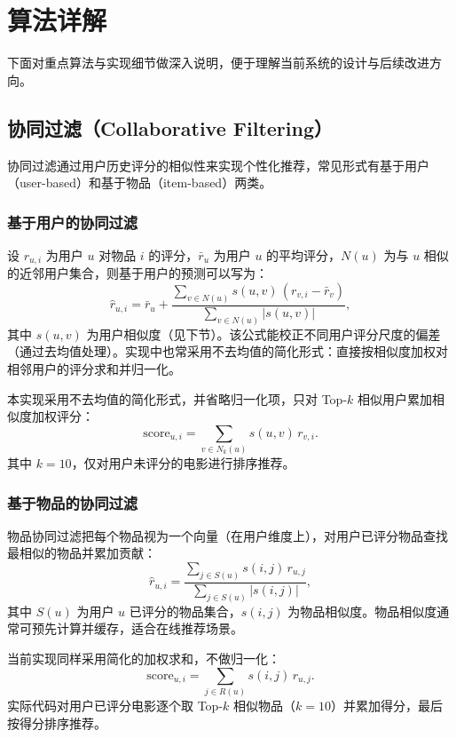 \section{算法详解}
下面对重点算法与实现细节做深入说明，便于理解当前系统的设计与后续改进方向。

\subsection{协同过滤（Collaborative Filtering）}
协同过滤通过用户历史评分的相似性来实现个性化推荐，常见形式有基于用户（user-based）和基于物品（item-based）两类。

\subsubsection{基于用户的协同过滤}
设 $r_{u,i}$ 为用户 $u$ 对物品 $i$ 的评分，$\bar r_u$ 为用户 $u$ 的平均评分，$N(u)$ 为与 $u$ 相似的近邻用户集合，则基于用户的预测可以写为：
$$
\hat r_{u,i} = \bar r_u + \frac{\sum_{v\in N(u)} s(u,v)\,(r_{v,i}-\bar r_v)}{\sum_{v\in N(u)} |s(u,v)|},
$$
其中 $s(u,v)$ 为用户相似度（见下节）。该公式能校正不同用户评分尺度的偏差（通过去均值处理）。实现中也常采用不去均值的简化形式：直接按相似度加权对相邻用户的评分求和并归一化。

本实现采用不去均值的简化形式，并省略归一化项，只对 Top-$k$ 相似用户累加相似度加权评分：
$$
\text{score}_{u,i}=\sum_{v\in N_k(u)} s(u,v)\, r_{v,i}.
$$
其中 $k=10$，仅对用户未评分的电影进行排序推荐。

\subsubsection{基于物品的协同过滤}
物品协同过滤把每个物品视为一个向量（在用户维度上），对用户已评分物品查找最相似的物品并累加贡献：
$$
\hat r_{u,i} = \frac{\sum_{j\in S(u)} s(i,j)\,r_{u,j}}{\sum_{j\in S(u)} |s(i,j)|},
$$
其中 $S(u)$ 为用户 $u$ 已评分的物品集合，$s(i,j)$ 为物品相似度。物品相似度通常可预先计算并缓存，适合在线推荐场景。

当前实现同样采用简化的加权求和，不做归一化：
$$
\text{score}_{u,i}=\sum_{j\in R(u)} s(i,j)\, r_{u,j}.
$$
实际代码对用户已评分电影逐个取 Top-$k$ 相似物品（$k=10$）并累加得分，最后按得分排序推荐。

